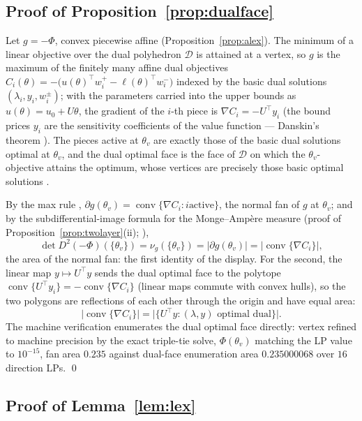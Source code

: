 \documentclass[11pt,a4paper]{article}
\theoremstyle{plain}
\theoremstyle{definition}
\theoremstyle{remark}
\begin{document}
\subsection{Proof of Proposition~\ref{prop:dualface}}

Let $g = -\Phi$, convex piecewise affine
(Proposition~\ref{prop:alex}). The minimum of a linear objective
over the dual polyhedron $\mathcal{D}$ is attained at a vertex, so
$g$ is the maximum of the finitely many affine dual objectives
$C_i(\theta) = -\bigl(u(\theta)^\top w_i^{+} - \ell(\theta)^\top
w_i^{-}\bigr)$ indexed by the basic dual solutions
$(\lambda_i, y_i, w_i^{\pm})$; with the parameters carried into the
upper bounds as $u(\theta) = u_0 + U\theta$, the gradient of the
$i$-th piece is $\nabla C_i = -U^{\top} y_i$ (the bound prices $y_i$
are the sensitivity coefficients of the value function --- Danskin's
theorem \citep{danskin1967}). The pieces active at $\theta_v$ are
exactly those of the basic dual solutions optimal at $\theta_v$, and
the dual optimal face is the face of $\mathcal{D}$ on which the
$\theta_v$-objective attains the optimum, whose vertices are
precisely those basic optimal solutions \citep{ziegler1995,
borrelli2003}.

By the max rule \citep{rockafellar1970},
$\partial g(\theta_v) = \operatorname{conv}\{\nabla C_i : i \text{
active}\}$, the normal fan of $g$ at $\theta_v$; and by the
subdifferential-image formula for the Monge--Amp\`ere measure (proof
of Proposition~\ref{prop:twolayer}(ii); \citealp{gutierrez2001}),
\[
\det D^{2}(-\Phi)(\{\theta_v\}) = \nu_g(\{\theta_v\})
= |\partial g(\theta_v)| = \bigl|\operatorname{conv}\{\nabla
C_i\}\bigr|,
\]
the area of the normal fan: the first identity of the display. For
the second, the linear map $y \mapsto U^{\top}y$ sends the dual
optimal face to the polytope $\operatorname{conv}\{U^{\top}y_i\} =
-\operatorname{conv}\{\nabla C_i\}$ (linear maps commute with
convex hulls), so the two polygons are reflections of each other
through the origin and have equal area:
\[
\bigl|\operatorname{conv}\{\nabla C_i\}\bigr|
= \bigl|\bigl\{U^{\top} y : (\lambda, y) \text{ optimal
dual}\bigr\}\bigr|.
\]
The machine verification enumerates the dual optimal face directly:
vertex refined to machine precision by the exact triple-tie solve,
$\Phi(\theta_v)$ matching the LP value to $10^{-15}$, fan area
$0.235$ against dual-face enumeration area $0.235000068$ over $16$
direction LPs. \qed

\subsection{Proof of Lemma~\ref{lem:lex}}
\end{document}
